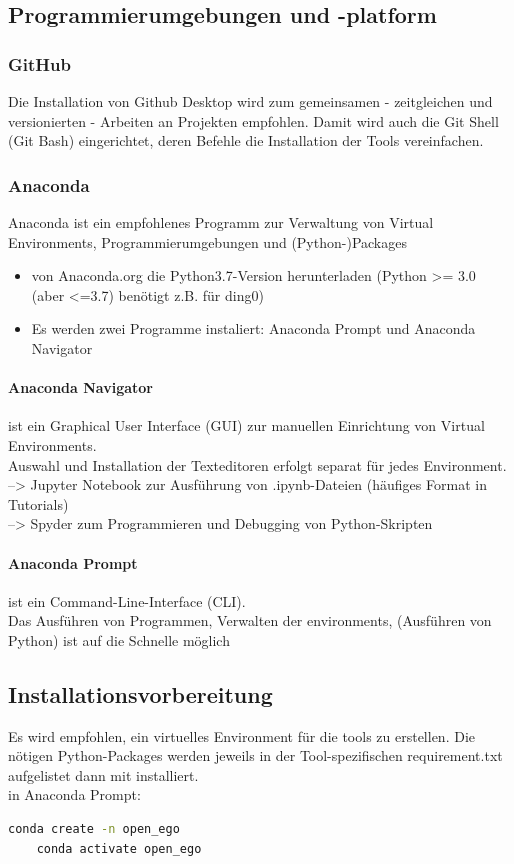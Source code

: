 \documentclass[
a4paper,     %
12pt         %
]{scrartcl}  %
\begin{document}
\subsection{Programmierumgebungen und -platform}
\subsubsection{GitHub}
Die Installation von Github Desktop wird zum gemeinsamen - zeitgleichen und versionierten - Arbeiten an Projekten empfohlen. Damit wird auch die Git Shell (Git Bash) eingerichtet, deren Befehle die Installation der Tools vereinfachen.

\subsubsection{Anaconda}
Anaconda ist ein empfohlenes Programm zur Verwaltung von Virtual Environments, Programmierumgebungen und (Python-)Packages

\begin{itemize}
	\item von Anaconda.org die Python3.7-Version herunterladen (Python >= 3.0 (aber <=3.7) benötigt z.B. für ding0)
	\item Es werden zwei Programme instaliert: Anaconda Prompt und Anaconda Navigator
\end{itemize}

\paragraph{Anaconda Navigator} ist ein Graphical User Interface (GUI) zur manuellen Einrichtung von Virtual Environments.\\
		 Auswahl und Installation der Texteditoren erfolgt separat für jedes Environment.\\
		 --> Jupyter Notebook zur Ausführung von .ipynb-Dateien (häufiges Format in Tutorials)\\
		 --> Spyder zum Programmieren und Debugging von Python-Skripten

\paragraph{Anaconda Prompt} ist ein Command-Line-Interface (CLI).\\
Das Ausführen von Programmen, Verwalten der environments, (Ausführen von Python) ist auf die Schnelle möglich

\subsection{Installationsvorbereitung}
Es wird empfohlen, ein virtuelles Environment für die tools zu erstellen. Die nötigen Python-Packages werden jeweils in der Tool-spezifischen requirement.txt aufgelistet dann mit installiert.
\\in Anaconda Prompt:
\begin{lstlisting}[language=bash]
	conda create -n open_ego
	conda activate open_ego
\end{lstlisting}
\end{document}
